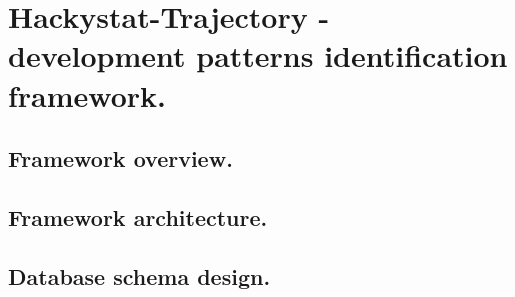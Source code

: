 \chapter{Hackystat-Trajectory - development patterns identification framework.}

\section{Framework overview.}

\section{Framework architecture.}

\section{Database schema design.}